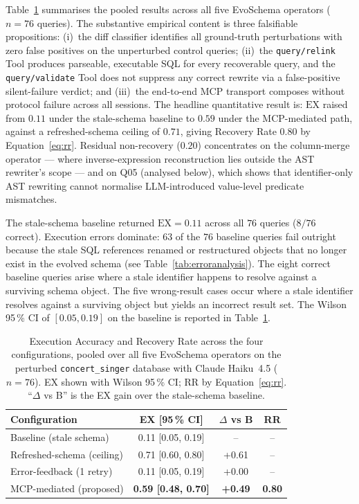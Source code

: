 \documentclass[conference,10pt,a4paper]{IEEEtran}
\begin{document}
Table~\ref{tab:results} summarises the pooled results across all five
EvoSchema operators ($n = 76$ queries). The substantive empirical
content is three falsifiable propositions: (i)~the diff classifier
identifies all ground-truth perturbations with zero false positives on
the unperturbed control queries; (ii)~the \texttt{query/relink} Tool
produces parseable, executable SQL for every recoverable query, and
the \texttt{query/validate} Tool does not suppress any correct rewrite
via a false-positive silent-failure verdict; and (iii)~the end-to-end
MCP transport composes without protocol failure across all sessions.
The headline quantitative result is: $\text{EX}$ raised from $0.11$
under the stale-schema baseline to $0.59$ under the MCP-mediated
path, against a refreshed-schema ceiling of $0.71$, giving Recovery
Rate $0.80$ by Equation~\ref{eq:rr}. Residual non-recovery ($0.20$)
concentrates on the column-merge operator --- where inverse-expression
reconstruction lies outside the AST rewriter's scope --- and on Q05
(analysed below), which shows that identifier-only AST rewriting
cannot normalise LLM-introduced value-level predicate mismatches.

The stale-schema baseline returned $\text{EX} = 0.11$ across all $76$
queries ($8/76$ correct). Execution errors dominate: $63$ of the $76$
baseline queries fail outright because the stale SQL references
renamed or restructured objects that no longer exist in the evolved
schema (see Table~\ref{tab:erroranalysis}). The eight correct baseline
queries arise where a stale identifier happens to resolve against a
surviving schema object. The five wrong-result cases occur where a
stale identifier resolves against a surviving object but yields an
incorrect result set. The Wilson 95\,\% CI of $[0.05, 0.19]$ on the
baseline is reported in Table~\ref{tab:results}.

\begin{table}[h!]
\centering
\caption{Execution Accuracy and Recovery Rate across the four
configurations, pooled over all five EvoSchema operators on the perturbed
\texttt{concert\_singer} database with Claude Haiku~4.5 ($n=76$). EX shown
with Wilson 95\,\% CI; RR by Equation~\ref{eq:rr}. ``$\Delta$ vs B'' is the
EX gain over the stale-schema baseline.}
\label{tab:results}
\begin{tabular}{lccc}
\toprule
\textbf{Configuration} & \textbf{EX [95\,\% CI]} & $\Delta$ \textbf{vs B} & \textbf{RR} \\
\midrule
Baseline (stale schema)     & 0.11 [0.05, 0.19] & --              & --            \\
Refreshed-schema (ceiling)  & 0.71 [0.60, 0.80] & +0.61           & --            \\
Error-feedback (1 retry)    & 0.11 [0.05, 0.19] & +0.00           & --            \\
MCP-mediated (proposed)     & \textbf{0.59 [0.48, 0.70]} & \textbf{+0.49} & \textbf{0.80} \\
\bottomrule
\end{tabular}
\end{table}
\end{document}

